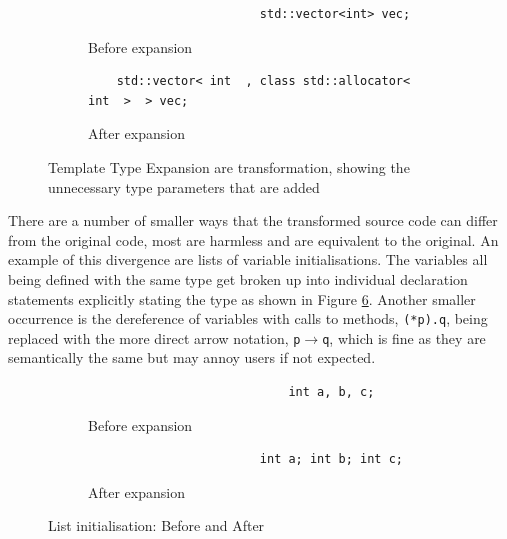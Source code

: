 \documentclass[bsc,frontabs,singlespacing,twoside,parskip,deptreport]{infthesis}
\begin{document}
\begin{figure}[H]
    \centering
    \begin{subfigure}[h]{\textwidth}
        \centering
        \begin{verbatim}
                        std::vector<int> vec;
        \end{verbatim}
        \caption{Before expansion}
        \label{fig:temp-expand-before}
        \vspace{0.40cm}
    \end{subfigure}
    \begin{subfigure}[h]{\textwidth}
        \centering
        \begin{verbatim}
    std::vector< int  , class std::allocator< int  >  > vec;
        \end{verbatim}
        \caption{After expansion}
        \label{fig:temp-expand-after}
    \end{subfigure}
    \caption{Template Type Expansion are transformation, showing the unnecessary type parameters that are added}
    \label{fig:temp-expand}
\end{figure}

There are a number of smaller ways that the transformed source code can differ from the original code, most are harmless and are equivalent to the original. An example of this divergence are lists of variable initialisations. The variables all being defined with the same type get broken up into individual declaration statements explicitly stating the type as shown in Figure \ref{fig:list-init}. Another smaller occurrence is the dereference of variables with calls to methods, \texttt{(*p).q}, being replaced with the more direct arrow notation, \texttt{p$\rightarrow$q}, which is fine as they are semantically the same but may annoy users if not expected. 

\begin{figure}[!h]
    \centering
    \begin{subfigure}[h]{\textwidth}
        \centering
        \begin{verbatim}
                            int a, b, c;
        \end{verbatim}
        \caption{Before expansion}
        \label{fig:list-init-before}
        \vspace{0.40cm}
    \end{subfigure}
    \begin{subfigure}[h]{\textwidth}
        \centering
        \begin{verbatim}
                        int a; int b; int c;
        \end{verbatim}
        \caption{After expansion}
        \label{fig:list-init-after}
    \end{subfigure}
    \caption{List initialisation: Before and After}
    \label{fig:list-init}
\end{figure}
\end{document}
